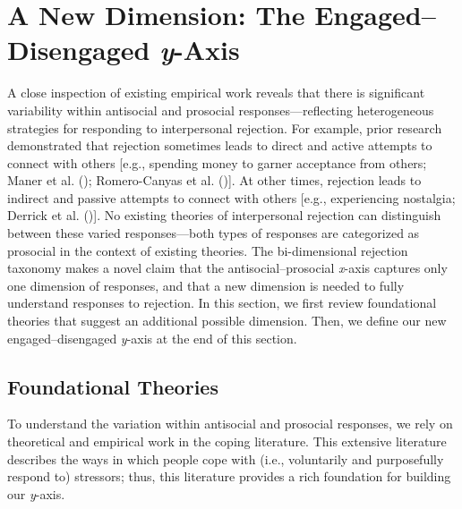 \documentclass[
]{udthesis}
\begin{document}
\section{\texorpdfstring{A New Dimension: The Engaged--Disengaged \emph{y}-Axis}{A New Dimension: The Engaged--Disengaged y-Axis}}\label{a-new-dimension-the-engageddisengaged-y-axis}

A close inspection of existing empirical work reveals that there is
significant variability within antisocial and prosocial
responses---reflecting heterogeneous strategies for responding to
interpersonal rejection. For example, prior research demonstrated that
rejection sometimes leads to direct and active attempts to connect with
others {[}e.g., spending money to garner acceptance from others;
Maner et al. (); Romero-Canyas et al. (){]}. At
other times, rejection leads to indirect and passive attempts to connect
with others {[}e.g., experiencing nostalgia;
Derrick et al. (){]}. No existing theories of interpersonal
rejection can distinguish between these varied responses---both types of
responses are categorized as prosocial in the context of existing
theories. The bi-dimensional rejection taxonomy makes a novel claim that
the antisocial--prosocial \emph{x}-axis captures only one dimension of
responses, and that a new dimension is needed to fully understand
responses to rejection. In this section, we first review foundational
theories that suggest an additional possible dimension. Then, we define
our new engaged--disengaged \emph{y}-axis at the end of this section.

\subsection{Foundational Theories}\label{foundational-theories}

To understand the variation within antisocial and prosocial responses,
we rely on theoretical and empirical work in the coping literature. This
extensive literature describes the ways in which people cope with (i.e.,
voluntarily and purposefully respond to) stressors; thus, this
literature provides a rich foundation for building our \emph{y}-axis.
\end{document}
